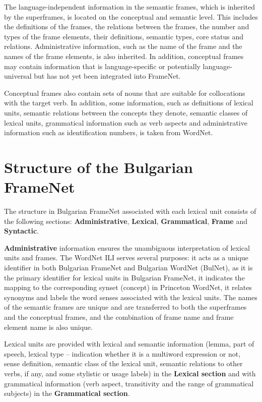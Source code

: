 \documentclass[output=paper,colorlinks,citecolor=brown]{langscibook}
\begin{document}
The language-independent information in the semantic frames, which is  inherited by the superframes, is located on the conceptual and semantic level. This includes the definitions of the frames, the relations between the frames, the number and types of the frame elements, their definitions, semantic types, core status and relations. Administrative information, such as the name of the frame and the names of the frame elements, is also inherited. In addition, conceptual frames may contain information that is language-specific or potentially language-uni\-versal but has not yet been integrated into FrameNet.

Conceptual frames also contain sets of nouns that are suitable for collocations with the target verb. In addition, some information, such as definitions of lexical units, semantic relations between the concepts they denote, semantic classes of lexical units, grammatical information such as verb aspects and administrative information such as identification numbers, is taken from WordNet.

\section{Structure of the Bulgarian FrameNet} 

The structure in Bulgarian FrameNet associated with each lexical unit consists of the following sections: \textbf{Administrative}, \textbf{Lexical}, \textbf{Grammatical}, \textbf{Frame} and \textbf{Syntactic}.

\textbf{Administrative} information ensures the unambiguous interpretation of lexical units and frames. The WordNet ILI \citep{Vossen2004} serves several purposes: it acts as a unique identifier in both Bulgarian FrameNet and Bulgarian WordNet (BulNet), as it is the primary identifier for lexical units in Bulgarian FrameNet, it indicates the mapping to the corresponding synset (concept) in Princeton WordNet, it relates synonyms and labels the word senses associated with the lexical units. The names of the semantic frames are unique and are transferred to both the superframes and the conceptual frames, and the combination of frame name and frame element name is also unique.

Lexical units are provided with lexical and semantic information (lemma, part of speech, lexical type -- indication whether it is a multiword expression or not, sense definition, semantic class of the lexical unit, semantic relations to other verbs, if any, and some stylistic or usage labels) in the \textbf{Lexical section} and with grammatical information (verb aspect, transitivity and the range of grammatical subjects) in the \textbf{Grammatical section}.
\end{document}
